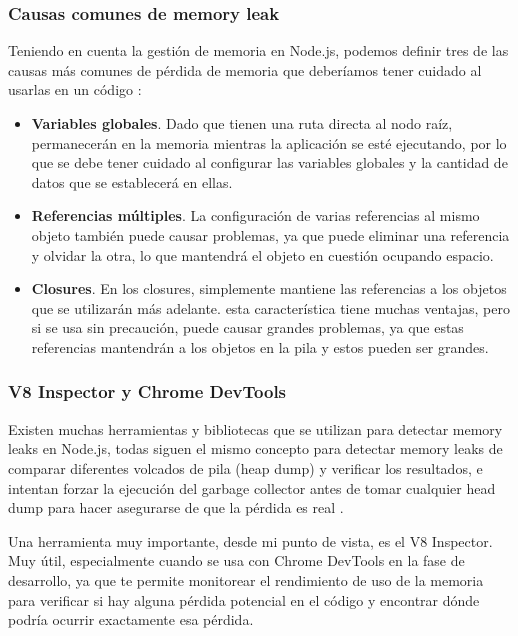 \subsubsection{Causas comunes de memory leak}

Teniendo en cuenta la gestión de memoria en Node.js, podemos definir tres de las causas más comunes de pérdida de memoria que deberíamos tener cuidado al usarlas en un código \cite{nodejs3}:

\begin{itemize}
  \item \textbf{Variables globales}. Dado que tienen una ruta directa al nodo raíz, permanecerán en la memoria mientras la aplicación se esté ejecutando, por lo que se debe tener cuidado al configurar las variables globales y la cantidad de datos que se establecerá en ellas.
  \item \textbf{Referencias múltiples}. La configuración de varias referencias al mismo objeto también puede causar problemas, ya que puede eliminar una referencia y olvidar la otra, lo que mantendrá el objeto en cuestión ocupando espacio.
  \item \textbf{Closures}. En los closures, simplemente mantiene las referencias a los objetos que se utilizarán más adelante. esta característica tiene muchas ventajas, pero si se usa sin precaución, puede causar grandes problemas, ya que estas referencias mantendrán a los objetos en la pila y estos pueden ser grandes.
\end{itemize}

\subsubsection{V8 Inspector y Chrome DevTools}

Existen muchas herramientas y bibliotecas que se utilizan para detectar memory leaks en Node.js, todas siguen el mismo concepto para detectar memory leaks de comparar diferentes volcados de pila (heap dump) y verificar los resultados, e intentan forzar la ejecución del garbage collector antes de tomar cualquier head dump para hacer asegurarse de que la pérdida es real \cite{nodejs3}.

Una herramienta muy importante, desde mi punto de vista, es el V8 Inspector. Muy útil, especialmente cuando se usa con Chrome DevTools en la fase de desarrollo, ya que te permite monitorear el rendimiento de uso de la memoria para verificar si hay alguna pérdida potencial en el código y encontrar dónde podría ocurrir exactamente esa pérdida.

